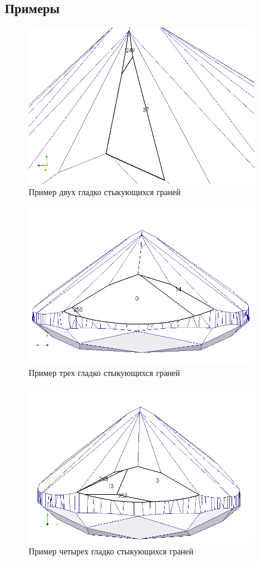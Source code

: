 \documentclass[a4paper,12pt, titlepage]{article}
\begin{document}
\subsection{Примеры} 
\begin{flushleft}
  \begin{figure}[ht]
    \includegraphics[clip, width=10cm]{polyhedron-2010-11-25/example-37-249.png}
    \caption{Пример двух гладко стыкующихся граней}\label{poly-join-1}
  \end{figure}
\end{flushleft}
\begin{flushleft}
  \begin{figure}[ht]
    \includegraphics[clip, width=10cm]{polyhedron-2010-11-25/example-0-14-250.png}
    \caption{Пример трех гладко стыкующихся граней}\label{poly-join-2}
  \end{figure}
\end{flushleft}
\begin{flushleft}
  \begin{figure}[ht]
    \includegraphics[clip, width=10cm]{polyhedron-2010-11-25/example-3-13-248-252.png}
    \caption{Пример четырех гладко стыкующихся граней}\label{poly-join-4}
  \end{figure}
\end{flushleft}
\end{document}
